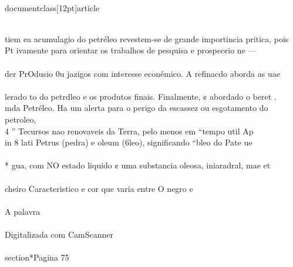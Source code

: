 \\documentclass[12pt]{article}
\begin{document}
\\
tiem ea acumulagio do petréleo revestem-se de grande importincia pritica, pois\\
Pt ivamente para orientar os trabalhos de pesquisa e prospec¢io ne —\\
\\
der PrOdusio 0u jazigos com interesse econémico. A refinacdo aborda as uae\\
\\
lerado to do petrdleo e os produtos finais. Finalmente, ¢ abordado o beret .\\
mda Petréleo. Ha um alerta para o perigo da escassez ou esgotamento do petroleo,\\
4 ” Tecursos nao renovaveis da Terra, pelo menos em “tempo util Ap\\
in 8 lati Petrus (pedra) e oleum (6leo), significando “bleo do Pate ue\\
\\
* gua, com NO estado liquido ¢ uma substancia oleosa, iniaradral, mae et\\
\\
cheiro Caracteristico e cor que varia entre O negro e\\
\\
A palavra\\
\\
Digitalizada com CamScanner\\

\\section*{Pagina 75}
\end{document}
